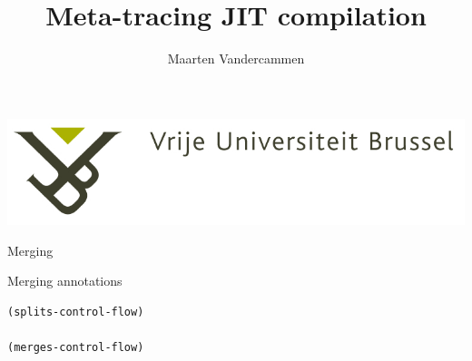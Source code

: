\documentclass{beamer}
\title{Meta-tracing JIT compilation}
\author{Maarten Vandercammen}
\date{}
\begin{document}
\begin{frame}[plain]
\includegraphics[width=0.4\paperwidth]{VUB_logo.jpg}
\vspace{2cm}
\titlepage
\end{frame}

\begin{frame}[fragile]{Merging}
\hspace{2.2cm}
\end{frame}

\begin{frame}[fragile]{Merging annotations}
\begin{lstlisting}[basicstyle = \small\ttfamily, escapechar = £]
(splits-control-flow)

(merges-control-flow)
\end{lstlisting}
\end{frame}
\end{document}
